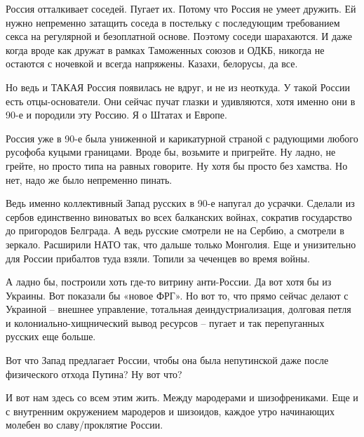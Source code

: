 Россия отталкивает соседей. Пугает их. Потому что Россия не умеет дружить. Ей
нужно непременно затащить соседа в постельку с последующим требованием секса на
регулярной и безоплатной основе. Поэтому соседи шарахаются. И даже когда вроде
как дружат в рамках Таможенных союзов и ОДКБ, никогда не остаются с ночевкой и
всегда напряжены. Казахи, белорусы, да все.

Но ведь и ТАКАЯ Россия появилась не вдруг, и не из неоткуда. У такой России
есть отцы-основатели. Они сейчас пучат глазки и удивляются, хотя именно они в
90-е и породили эту Россию. Я о Штатах и Европе.

Россия уже в 90-е была униженной и карикатурной страной с радующими любого
русофоба куцыми границами. Вроде бы, возьмите и пригрейте. Ну ладно, не грейте,
но просто типа на равных говорите. Ну хотя бы просто без хамства. Но нет, надо
же было непременно пинать.

Ведь именно коллективный Запад русских в 90-е напугал до усрачки. Сделали из
сербов единственно виноватых во всех балканских войнах, сократив государство до
пригородов Белграда. А ведь русские смотрели не на Сербию, а смотрели в
зеркало. Расширили НАТО так, что дальше только Монголия. Еще и унизительно для
России прибалтов туда взяли. Топили за чеченцев во время войны.

А ладно бы, построили хоть где-то витрину анти-России. Да вот хотя бы из
Украины. Вот показали бы «новое ФРГ». Но вот то, что прямо сейчас делают с
Украиной – внешнее управление, тотальная деиндустриализация, долговая петля и
колониально-хищнический вывод ресурсов – пугает и так перепуганных русских еще
больше.

Вот что Запад предлагает России, чтобы она была непутинской даже после
физического отхода Путина? Ну вот что?

И вот нам здесь со всем этим жить. Между мародерами и шизофрениками. Еще и с
внутренним окружением мародеров и шизоидов, каждое утро начинающих молебен во
славу/проклятие России.

